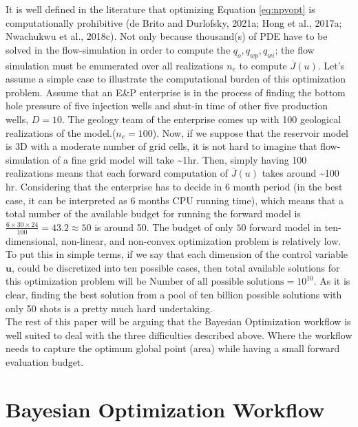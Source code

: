 \documentclass[]{elsarticle} %
\begin{document}
It is well defined in the literature that optimizing Equation \eqref{eq:npvopt} is computationally prohibitive (de Brito and Durlofsky, 2021a; Hong et al., 2017a; Nwachukwu et al., 2018c). Not only because thousand(s) of PDE have to be solved in the flow-simulation in order to compute the \(q_o, q_{wp}, q_{wi}\); the flow simulation must be enumerated over all realizations \(n_e\) to compute \(\overline{J}(u)\). Let's assume a simple case to illustrate the computational burden of this optimization problem. Assume that an E\&P enterprise is in the process of finding the bottom hole pressure of five injection wells and shut-in time of other five production wells, \(D=10\). The geology team of the enterprise comes up with 100 geological realizations of the model.(\(n_e=100\)). Now, if we suppose that the reservoir model is 3D with a moderate number of grid cells, it is not hard to imagine that flow-simulation of a fine grid model will take \textasciitilde1hr. Then, simply having 100 realizations means that each forward computation of \(\overline{J}(u)\) takes around \textasciitilde100 hr. Considering that the enterprise has to decide in 6 month period (in the best case, it can be interpreted as 6 months CPU running time), which means that a total number of the available budget for running the forward model is\(\frac{6 \times 30 \times 24 }{100}= 43.2 \approx 50\) is around 50. The budget of only \(50\) forward model in ten-dimensional, non-linear, and non-convex optimization problem is relatively low. To put this in simple terms, if we say that each dimension of the control variable \(\mathbf{u}\), could be discretized into ten possible cases, then total available solutions for this optimization problem will be \(\text {Number of all possible solutions} = 10^{10}\). As it is clear, finding the best solution from a pool of ten billion possible solutions with only 50 shots is a pretty much hard undertaking.\\

The rest of this paper will be arguing that the Bayesian Optimization workflow is well suited to deal with the three difficulties described above. Where the workflow needs to capture the optimum global point (area) while having a small forward evaluation budget.

\newpage

\hypertarget{bayesian-optimization-workflow}{%
\section{Bayesian Optimization Workflow}\label{bayesian-optimization-workflow}}
\end{document}
